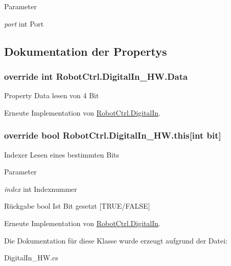 \begin{DoxyParams}{Parameter}
\item[{\em port}]int Port \end{DoxyParams}


\subsection{Dokumentation der Propertys}
\hypertarget{class_robot_ctrl_1_1_digital_in___h_w_a22093ed6e3a1b15bbb0406fd56d9b0cc}{
\subsubsection[{Data}]{\setlength{\rightskip}{0pt plus 5cm}override int RobotCtrl.DigitalIn\_\-HW.Data}}
\label{class_robot_ctrl_1_1_digital_in___h_w_a22093ed6e3a1b15bbb0406fd56d9b0cc}
Property Data lesen von 4 Bit 

Erneute Implementation von \hyperlink{class_robot_ctrl_1_1_digital_in_a9f730b21d4845684a1e085293d2cba50}{RobotCtrl.DigitalIn}.

\hypertarget{class_robot_ctrl_1_1_digital_in___h_w_a1197c7dee03f1a9844a5824e3c6e0941}{
\subsubsection[{this}]{\setlength{\rightskip}{0pt plus 5cm}override bool RobotCtrl.DigitalIn\_\-HW.this\mbox{[}int bit\mbox{]}}}
\label{class_robot_ctrl_1_1_digital_in___h_w_a1197c7dee03f1a9844a5824e3c6e0941}
Indexer Lesen eines bestimmten Bits


\begin{DoxyParams}{Parameter}
\item[{\em index}]int Indexnummer \end{DoxyParams}
\begin{DoxyReturn}{Rückgabe}
bool Ist Bit gesetzt \mbox{[}TRUE/FALSE\mbox{]} 
\end{DoxyReturn}


Erneute Implementation von \hyperlink{class_robot_ctrl_1_1_digital_in_adabed7783bc3ad5603e1adbf2bc37484}{RobotCtrl.DigitalIn}.



Die Dokumentation für diese Klasse wurde erzeugt aufgrund der Datei:\begin{DoxyCompactItemize}
\item 
DigitalIn\_\-HW.cs\end{DoxyCompactItemize}
